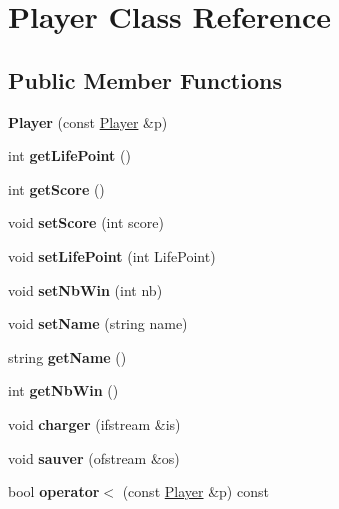 \hypertarget{class_player}{}\section{Player Class Reference}
\label{class_player}
\subsection*{Public Member Functions}
\begin{DoxyCompactItemize}
\item 
\mbox{\label{class_player_adf2e45581d8fd61e26328fa48d13b9b7}} 
{\bfseries Player} (const \mbox{\hyperlink{class_player}{Player}} \&p)
\item 
\mbox{\label{class_player_ac3ad5e51b95a604a27c6f8ac6ecc6f90}} 
int {\bfseries get\+Life\+Point} ()
\item 
\mbox{\label{class_player_a97e5447778ae6c384eedc532dcd8431d}} 
int {\bfseries get\+Score} ()
\item 
\mbox{\label{class_player_a23c9b25aeb8dd1ff86d03d993e07a73d}} 
void {\bfseries set\+Score} (int score)
\item 
\mbox{\label{class_player_a3fc95cf72792aad03d73c58998ab2643}} 
void {\bfseries set\+Life\+Point} (int Life\+Point)
\item 
\mbox{\label{class_player_a6072dd0a4fe43d4f4bd418b612c96f7c}} 
void {\bfseries set\+Nb\+Win} (int nb)
\item 
\mbox{\label{class_player_aa9728db5b22d438505b4694c5ea03f75}} 
void {\bfseries set\+Name} (string name)
\item 
\mbox{\label{class_player_af9a6045fa96f736664c4eab4caa5e8e5}} 
string {\bfseries get\+Name} ()
\item 
\mbox{\label{class_player_a47147bc978d0f5e89db3a6c40b9215db}} 
int {\bfseries get\+Nb\+Win} ()
\item 
\mbox{\label{class_player_aef7ebb7b9d9e1bd5383f30f74e4accf2}} 
void {\bfseries charger} (ifstream \&is)
\item 
\mbox{\label{class_player_ab5e7a54f06ca7caf4fa48860d67f9dc6}} 
void {\bfseries sauver} (ofstream \&os)
\item 
\mbox{\label{class_player_af1a5f90edb6b0705a4ad4c6d23b79d95}} 
bool {\bfseries operator$<$} (const \mbox{\hyperlink{class_player}{Player}} \&p) const
\end{DoxyCompactItemize}


